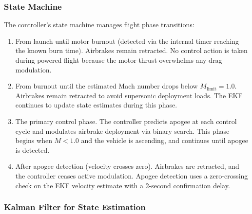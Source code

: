 \documentclass[11pt,letterpaper]{article}
\begin{document}
\subsubsection{State Machine}
\label{sec:state_machine}

The controller's state machine manages flight phase transitions:

\begin{enumerate}[label=\textbf{Phase \arabic*:}, leftmargin=3.5cm]
    \item[\textbf{Boost}] From launch until motor burnout (detected via the internal timer reaching the known burn time). Airbrakes remain retracted. No control action is taken during powered flight because the motor thrust overwhelms any drag modulation.
    \item[\textbf{Transonic Lockout}] From burnout until the estimated Mach number drops below $M_{\mathrm{limit}} = 1.0$. Airbrakes remain retracted to avoid supersonic deployment loads. The EKF continues to update state estimates during this phase.
    \item[\textbf{Active Coast}] The primary control phase. The controller predicts apogee at each control cycle and modulates airbrake deployment via binary search. This phase begins when $M < 1.0$ and the vehicle is ascending, and continues until apogee is detected.
    \item[\textbf{Recovery}] After apogee detection (velocity crosses zero). Airbrakes are retracted, and the controller ceases active modulation. Apogee detection uses a zero-crossing check on the EKF velocity estimate with a 2-second confirmation delay.
\end{enumerate}

\subsubsection{Kalman Filter for State Estimation}
\label{sec:ekf}
\end{document}
